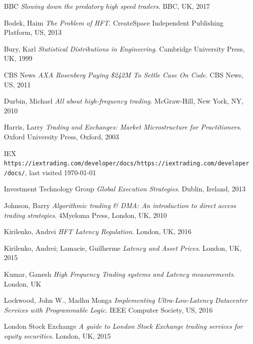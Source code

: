 \documentclass[12pt]{article}
\begin{document}
\pagebreak
\begin{thebibliography}{9}

%

BBC 
\textit{Slowing down the predatory high speed traders}.
BBC, UK, 2017

Bodek, Haim
\textit{The Problem of HFT}.
CreateSpace Independent Publishing Platform, US, 2013

Bury, Karl
\textit{Statistical Distributions in Engineering}.
Cambridge University Press, UK, 1999

CBS News
\textit{AXA Rosenberg Paying \$242M To Settle Case On Code}.
CBS News, US, 2011

Durbin, Michael
\textit{All about high-frequency trading}.
McGraw-Hill, New York, NY, 2010

Harris, Larry
\textit{Trading and Exchanges: Market Microstructure for Practitioners}.
Oxford University Press, Oxford, 2003

IEX
\texttt{https://iextrading.com/developer/docs/https://iextrading.com/developer/docs/}, last visited \today

Investment Technology Group
\textit{Global Execution Strategies}.
Dublin, Ireland, 2013

Johnson, Barry
\textit{Algorithmic trading \& DMA: An introduction to direct access trading strategies}.
4Myeloma Press, London, UK, 2010

Kirilenko, Andrei
\textit{HFT Latency Regulation}.
London, UK, 2016

Kirilenko, Andrei; Lamacie, Guilherme
\textit{Latency and Asset Prices}.
London, UK, 2015

Kumar, Ganesh
\textit{High Frequency Trading systems and Latency measurements}.
London, UK

Lockwood, John W., Madhu Monga
\textit{Implementing Ultra-Low-Latency Datacenter Services with Programmable Logic}.
IEEE Computer Society, US, 2016

London Stock Exchange
\textit{A guide to London Stock Exchange 
trading services for equity securities}.
London, UK, 2015


\end{thebibliography}
\end{document}
